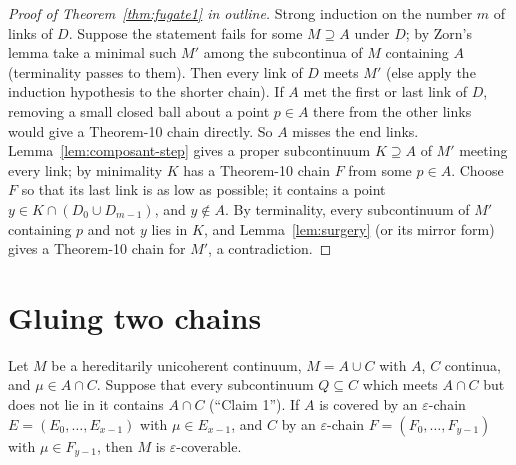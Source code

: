 
\begin{proof}[Proof of Theorem~\ref{thm:fugate1} in outline]
Strong induction on the number $m$ of links of $D$. Suppose the statement fails for some $M\supseteq A$ under $D$; by Zorn's lemma take a minimal such
$M'$ among the subcontinua of $M$ containing $A$ (terminality passes to them). Then every link of $D$ meets $M'$ (else apply the induction hypothesis to the
shorter chain). If $A$ met the first or last link of $D$, removing a small closed ball about a point $p\in A$ there from the other links would give a
Theorem-10 chain directly. So $A$ misses the end links. Lemma~\ref{lem:composant-step} gives a proper subcontinuum $K\supseteq A$ of $M'$ meeting every
link; by minimality $K$ has a Theorem-10 chain $F$ from some $p\in A$. Choose $F$ so that its last link is as low as possible; it contains a point
$y\in K\cap(D_0\cup D_{m-1})$, and $y\notin A$. By terminality, every subcontinuum of $M'$ containing $p$ and not $y$ lies in $K$, and
Lemma~\ref{lem:surgery} (or its mirror form) gives a Theorem-10 chain for $M'$, a contradiction.
\end{proof}


\section{Gluing two chains}

\begin{proposition}[Fugate, p.~392]\label{prop:glue-halves}
Let $M$ be a hereditarily unicoherent continuum, $M=A\cup C$ with $A$, $C$ continua, and $\mu\in A\cap C$. Suppose that every subcontinuum $Q\subseteq C$
which meets $A\cap C$ but does not lie in it contains $A\cap C$ (``Claim 1''). If $A$ is covered by an $\varepsilon$-chain $E=(E_0,\dots,E_{x-1})$ with
$\mu\in E_{x-1}$, and $C$ by an $\varepsilon$-chain $F=(F_0,\dots,F_{y-1})$ with $\mu\in F_{y-1}$, then $M$ is $\varepsilon$-coverable.
\end{proposition}

